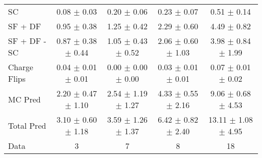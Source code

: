 \begin{tabular}{l|cccc}
                                 SC &  0.08 $\pm$  0.03 &  0.20 $\pm$  0.06 &  0.23 $\pm$  0.07 &  0.51 $\pm$  0.14 \\
                            SF + DF &  0.95 $\pm$  0.38 &  1.25 $\pm$  0.42 &  2.29 $\pm$  0.60 &  4.49 $\pm$  0.82 \\
\hline
                       SF + DF - SC &  0.87 $\pm$  0.38 $\pm$  0.44 &  1.05 $\pm$  0.43 $\pm$  0.52 &  2.06 $\pm$  0.60 $\pm$  1.03 &  3.98 $\pm$  0.84 $\pm$  1.99 \\
\hline\hline
                       Charge Flips &  0.04 $\pm$  0.01 $\pm$  0.01 &  0.00 $\pm$  0.00 $\pm$  0.00 &  0.03 $\pm$  0.01 $\pm$  0.01 &  0.07 $\pm$  0.01 $\pm$  0.02 \\
\hline
                            MC Pred &  2.20 $\pm$  0.47 $\pm$  1.10 &  2.54 $\pm$  1.19 $\pm$  1.27 &  4.33 $\pm$  0.55 $\pm$  2.16 &  9.06 $\pm$  0.68 $\pm$  4.53 \\
\hline
                         Total Pred &  3.10 $\pm$  0.60 $\pm$  1.18 &  3.59 $\pm$  1.26 $\pm$  1.37 &  6.42 $\pm$  0.82 $\pm$  2.40 & 13.11 $\pm$  1.08 $\pm$  4.95 \\
\hline\hline
                               Data &     3 &     7 &     8 &    18 \\
\hline\hline
\end{tabular}

